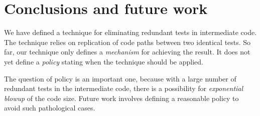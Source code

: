 \section{Conclusions and future work}

We have defined a technique for eliminating redundant tests in
intermediate code.  The technique relies on replication of code paths
between two identical tests.  So far, our technique only defines a
\emph{mechanism} for achieving the result.  It does not yet define a
\emph{policy} stating when the technique should be applied.

The question of policy is an important one, because with a large
number of redundant tests in the intermediate code, there is a
possibility for \emph{exponential blowup} of the code size.
Future work involves defining a reasonable policy to avoid such
pathological cases.
